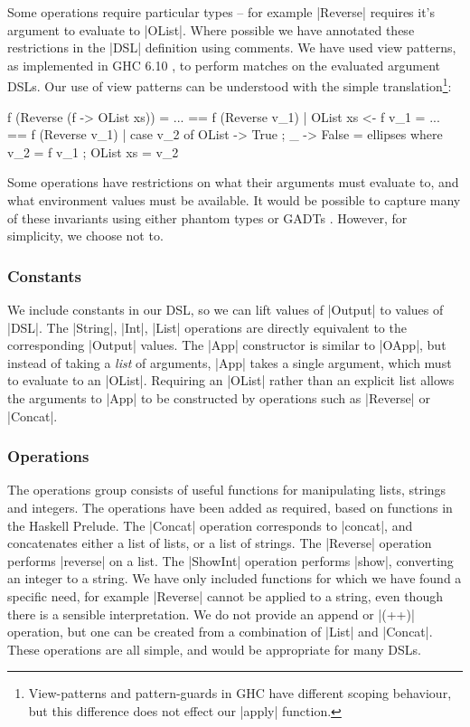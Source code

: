 \documentclass{llncs}
\begin{document}
Some operations require particular types -- for example |Reverse| requires it's argument to evaluate to |OList|. Where possible we have annotated these restrictions in the |DSL| definition using comments. We have used view patterns, as implemented in GHC 6.10 \cite{ghc6_10}, to perform matches on the evaluated argument DSLs. Our use of view patterns can be understood with the simple translation\footnote{View-patterns and pattern-guards in GHC have different scoping behaviour, but this difference does not effect our |apply| function.}:

\ignore\begin{code}
f (Reverse (f -> OList xs)) = ...
    ==
f (Reverse v_1) | OList xs <- f v_1 = ...
    ==
f (Reverse v_1) | case v_2 of OList{} -> True ; _ -> False = ellipses
    where  v_2 = f v_1 ; OList xs = v_2
\end{code}

Some operations have restrictions on what their arguments must evaluate to, and what environment values must be available. It would be possible to capture many of these invariants using either phantom types \cite{fluet:phantom} or GADTs \cite{spj:gadt}. However, for simplicity, we choose not to.

\subsubsection{Constants}

We include constants in our DSL, so we can lift values of |Output| to values of |DSL|. The |String|, |Int|, |List| operations are directly equivalent to the corresponding |Output| values. The |App| constructor is similar to |OApp|, but instead of taking a \textit{list} of arguments, |App| takes a single argument, which must to evaluate to an |OList|. Requiring an |OList| rather than an explicit list allows the arguments to |App| to be constructed by operations such as |Reverse| or |Concat|.

\subsubsection{Operations}

The operations group consists of useful functions for manipulating lists, strings and integers. The operations have been added as required, based on functions in the Haskell Prelude. The |Concat| operation corresponds to |concat|, and concatenates either a list of lists, or a list of strings. The |Reverse| operation performs |reverse| on a list. The |ShowInt| operation performs |show|, converting an integer to a string. We have only included functions for which we have found a specific need, for example |Reverse| cannot be applied to a string, even though there is a sensible interpretation. We do not provide an append or |(++)| operation, but one can be created from a combination of |List| and |Concat|. These operations are all simple, and would be appropriate for many DSLs.
\end{document}

